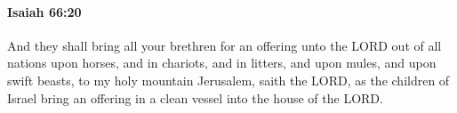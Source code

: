 
		\paragraph{Isaiah 66:20} %
			\label{ISAIAH-66-20}

			And they shall bring all your brethren for an offering unto the LORD out of all nations upon horses, and in chariots, and in litters, and upon mules, and upon swift beasts, to my holy mountain Jerusalem, saith the LORD, as the children of Israel bring an offering in a clean vessel into the house of the LORD.


